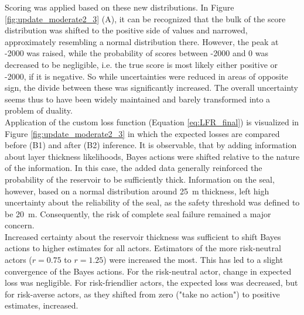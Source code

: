 				Scoring was applied based on these new distributions. In Figure \ref{fig:update_moderate2_3} (A), it can be recognized that the bulk of the score distribution was shifted to the positive side of values and narrowed, approximately resembling a normal distribution there. However, the peak at -2000 was raised, while the probability of scores between -2000 and 0 was decreased to be negligible, i.e. the true score is most likely either positive or -2000, if it is negative. So while uncertainties were reduced in areas of opposite sign, the divide between these was significantly increased. The overall uncertainty seems thus to have been widely maintained and barely transformed into a problem of duality.\\
				Application of the custom loss function (Equation \ref{eq:LFR_final}) is visualized in Figure \ref{fig:update_moderate2_3} in which the expected losses are compared before (B1) and after (B2) inference. It is observable, that by adding information about layer thickness likelihoods, Bayes actions were shifted relative to the nature of the information. In this case, the added data generally reinforced the probability of the reservoir to be sufficiently thick. Information on the seal, however, based on a normal distribution around 25~m thickness, left high uncertainty about the reliability of the seal, as the safety threshold was defined to be 20~m. Consequently, the risk of complete seal failure remained a major concern.\\				
				Increased certainty about the reservoir thickness was sufficient to shift Bayes actions to higher estimates for all actors. Estimators of the more risk-neutral actors ($r = 0.75$ to $r=1.25$) were increased the most. This has led to a slight convergence of the Bayes actions. For the risk-neutral actor, change in expected loss was negligible. For risk-friendlier actors, the expected loss was decreased, but for risk-averse actors, as they shifted from zero ("take no action") to positive estimates, increased.\\	
								
